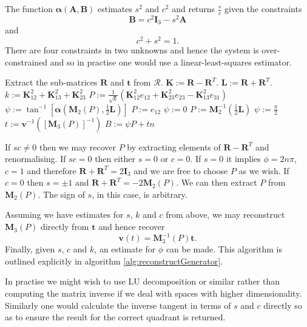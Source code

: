 \begin{definition}
The function $\mathbf{\alpha}(\mathbf{A},\mathbf{B})$ estimates $s^2$ 
and $c^2$ and returns $\frac{s}{c}$ given the constraints
\[
\mathbf{B} = c^2 \mathbf{I}_3 - s^2\mathbf{A}
\]
and
\[
c^2 + s^2 = 1.
\]
There are four constraints in two unknowns and hence the system is over-constrained and
so in practise one would use a linear-least-squares estimator.
\end{definition}

\begin{fancyalg}
\begin{algorithmic}[1]
\STATE Extract the sub-matrices $\mathbf{R}$ and $\mathbf{t}$ from $\mathcal{R}$.
\STATE $\mathbf{K} := \mathbf{R} - \mathbf{R}^T$.
\STATE $\mathbf{L} := \mathbf{R} + \mathbf{R}^T$.
\STATE $k := \mathbf{K}^2_{12} + \mathbf{K}^2_{13} + \mathbf{K}^2_{23} $
\STATE $P := \frac{1}{\sqrt{k}}\left(\mathbf{K}^2_{12}e_{12} + \mathbf{K}^2_{23}e_{23} - \mathbf{K}^2_{13}e_{31}\right)$
\STATE $\psi := \tan^{-1}\left[\mathbf{\alpha}\left(\mathbf{M}_2(P), \frac{1}{2}\mathbf{L}\right)\right]$
\ELSE
{}
\STATE $P := e_{12}$
\STATE $\psi := 0$
\ELSE
\STATE $P := \mathbf{M}^{-1}_2\left(\frac{1}{2}\mathbf{L}\right)$
\STATE $\psi := \frac{\pi}{2}$
\ENDIF
\ENDIF
\STATE $t := \mathbf{v}^{-1}\left(\left[\mathbf{M}_3(P)\right]^{-1}\right)$
\STATE $B := \psi P + tn$
\end{algorithmic}
\caption{Reconstruction of a generator from a $4\times4$ transformation matrix.%
\label{alg:reconstructGenerator}}
\end{fancyalg}

If $sc \ne 0$ then we may recover $P$ by extracting elements of 
$\mathbf{R} - \mathbf{R}^{T}$ and renormalising. If $sc = 0$ then either
$s = 0$ or $c = 0$. If $s = 0$ it implies $\phi = 2n\pi$, $c = 1$ and 
therefore
$\mathbf{R} + \mathbf{R}^{T} = 2\mathbf{I}_3$ and
we are free to choose $P$ as we wish. If $c = 0$ then $s = \pm 1$
and $\mathbf{R} + \mathbf{R}^{T} = -2 \mathbf{M}_2(P)$. We can then
extract $P$ from $\mathbf{M}_2(P)$. The sign of $s$, in this case, is arbitrary.

Assuming we have estimates for $s$, $k$ and $c$ from above, we may
reconstruct $\mathbf{M}_3(P)$ directly from $\mathbf{t}$ and hence recover
\[
\mathbf{v}(t) = \mathbf{M}^{-1}_3(P) \mathbf{t}.
\]
Finally, given $s$, $c$ and $k$, an estimate for 
$\phi$ can be made. This algorithm is outlined explicitly in algorithm 
\ref{alg:reconstructGenerator}.

In practise we might wish to use LU decomposition or similar rather
than computing the matrix inverse if we deal with spaces with higher
dimensionality. Similarly one would calculate the inverse tangent in terms
of $s$ and $c$ directly so as to ensure the result for the correct quadrant is
returned.
